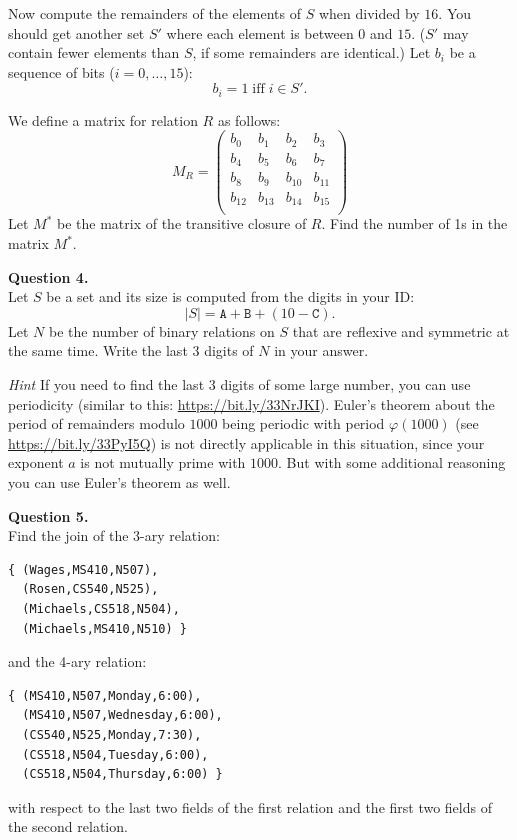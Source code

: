 \documentclass[jou]{apa6}
\begin{document}
Now compute the remainders of the elements of $S$ when divided by $16$. 
You should get another set $S'$ where each element is between $0$ and $15$. 
($S'$ may contain fewer elements than $S$, if some remainders are identical.)
Let $b_i$ be a sequence of bits ($i = 0,\ldots,15$):
$$b_i = 1\;\text{iff}\;i \in S'.$$

We define a matrix for relation $R$ as follows:
$$M_R = \left( \begin{array}{cccc}
b_{0} & b_1 & b_2 & b_3 \\
b_{4} & b_5 & b_6 & b_7 \\
b_{8} & b_9 & b_{10} & b_{11} \\
b_{12} & b_{13} & b_{14} & b_{15} \\
\end{array} \right)$$
Let $M^{\ast}$ be the matrix of the transitive closure of $R$. 
Find the number of 1s in the matrix $M^{\ast}$.


\vspace{6pt}
{\bf Question 4.}\\
Let $S$ be a set and its size is computed from the digits in your ID:
$$|S| = \mathtt{A}+\mathtt{B}+(10 - \mathtt{C}).$$ 
Let $N$ be the number of binary relations on $S$ that are  
reflexive and symmetric at the same time.
Write the last $3$ digits of $N$ in your answer.

{\em Hint} If you need to find the last $3$ digits of some large number, you 
can use periodicity (similar to this: \url{https://bit.ly/33NrJKI}). Euler's theorem 
about the period of remainders modulo $1000$ being periodic with period $\varphi(1000)$ 
(see \url{https://bit.ly/33PyI5Q}) is not directly applicable in this situation,
since your exponent $a$ is not mutually prime with $1000$.
But with some additional reasoning you 
can use Euler's theorem as well.


\vspace{6pt}
{\bf Question 5.}\\
Find the join of the 3-ary relation:
\begin{verbatim}
{ (Wages,MS410,N507),
  (Rosen,CS540,N525),
  (Michaels,CS518,N504),
  (Michaels,MS410,N510) }
\end{verbatim}
and the 4-ary relation:
\begin{verbatim}
{ (MS410,N507,Monday,6:00), 
  (MS410,N507,Wednesday,6:00), 
  (CS540,N525,Monday,7:30),
  (CS518,N504,Tuesday,6:00), 
  (CS518,N504,Thursday,6:00) }
\end{verbatim}
with respect to the last two fields of the first relation and 
the first two fields of the second relation. 
\end{document}
